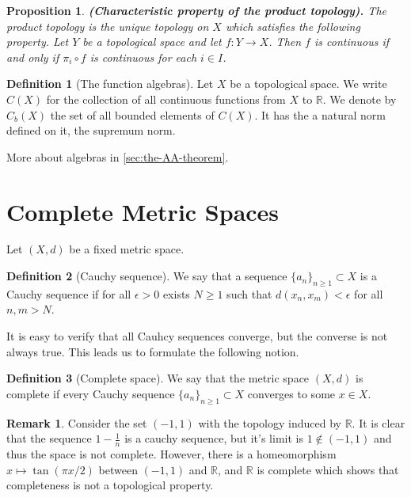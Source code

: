 \documentclass[11pt,a4paper]{article}
\theoremstyle{definition}
\newtheorem{definition}{Definition}[section]
\newtheorem{remark}{Remark}[section]
\theoremstyle{plain}
\newtheorem{proposition}[theorem]{Proposition}
\newcommand{\R}{\mathbb{R}}
\renewcommand{\tt}[1]{\textnormal{\textbf{(#1).}}} %
\begin{document}
  \begin{proposition}
    \tt{Characteristic property of the product topology}
    The product topology is the unique topology on $X$ which satisfies the 
    following property. Let $Y$ be a topological space and let 
    $f \colon Y \to X$. Then $f$ is continuous if and only if 
    $\pi_i \circ f$ is continuous for each $i \in I$.
  \end{proposition}

  \begin{definition}[The function algebras]
    Let $X$ be a topological space. We write $C(X)$ for the collection of 
    all continuous functions from $X$ to $\R$. We denote by $C_b(X)$ the set 
    of all bounded elements of $C(X)$. It has the a natural norm defined on
    it, the supremum norm.
  \end{definition}

  More about algebras in \autoref{sec:the-AA-theorem}.

  \newpage

  \section{Complete Metric Spaces}\label{sec:complete-metric-spaces}
  Let $(X,d)$ be a fixed metric space.

  \begin{definition}[Cauchy sequence]
    We say that a sequence $\{a_n\}_{n \geq 1} \subset X$ is a Cauchy
    sequence if for all $\epsilon > 0$ exists $N \geq 1$ such that 
    $d(x_n,x_m) < \epsilon$ for all $n,m > N$.
  \end{definition}

  It is easy to verify that all Cauhcy sequences converge, but the converse
  is not always true. This leads us to formulate the following notion.

  \begin{definition}[Complete space]
    We say that the metric space $(X,d)$ is complete if every Cauchy
    sequence $\{a_n\}_{n \geq 1} \subset X$ converges to some $x \in X$.
  \end{definition}

  \begin{remark}
    Consider the set $(-1,1)$ with the topology induced by $\R$. It is
    clear that the sequence $1 - \frac{1}{n}$ is a cauchy sequence, but
    it's limit is $1 \notin (-1,1)$ and thus the space is not complete.
    However, there is a homeomorphism $x \mapsto \tan(\pi x/2)$ between
    $(-1,1)$ and $\R$, and $\R$ is complete which shows that completeness
    is not a topological property.
  \end{remark}
\end{document}
